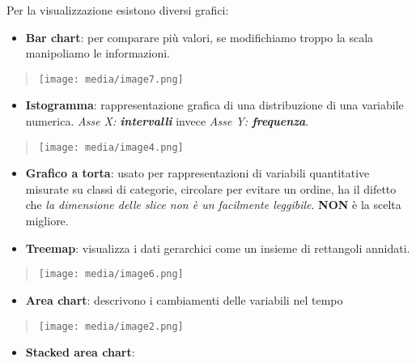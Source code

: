 Per la visualizzazione esistono diversi grafici:

\begin{itemize}
\item
  \textbf{Bar chart}: per comparare più valori, se modifichiamo troppo
  la scala manipoliamo le informazioni.
\end{itemize}

\begin{quote}
\texttt{[image: media/image7.png]}
\end{quote}

\begin{itemize}
\item
  \textbf{Istogramma}: rappresentazione grafica di una distribuzione di
  una variabile numerica. \emph{Asse X: \textbf{intervalli}} invece
  \emph{Asse Y: \textbf{frequenza}}.
\end{itemize}

\begin{quote}
\texttt{[image: media/image4.png]}
\end{quote}

\begin{itemize}
\item
  \textbf{Grafico a torta}: usato per rappresentazioni di variabili
  quantitative misurate su classi di categorie, circolare per evitare un
  ordine, ha il difetto che \emph{la dimensione delle slice non è un
  facilmente leggibile}. \textbf{NON} è la scelta migliore.
\item
  \textbf{Treemap}: visualizza i dati gerarchici come un insieme di
  rettangoli annidati.
\end{itemize}

\begin{quote}
\texttt{[image: media/image6.png]}
\end{quote}

\begin{itemize}
\item
  \textbf{Area chart}: descrivono i cambiamenti delle variabili nel
  tempo
\end{itemize}

\begin{quote}
\texttt{[image: media/image2.png]}
\end{quote}

\begin{itemize}
\item
  \textbf{Stacked area chart}:
\end{itemize}

